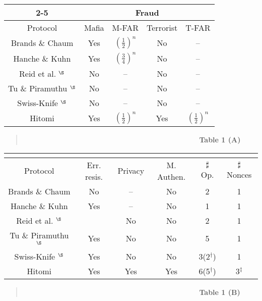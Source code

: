 \documentclass{article}
\begin{document}
\begin{table*}
  \centering
  \caption{Performance Comparison of distance bounding protocols}\label{table::pcomparison}
\begin{scriptsize}
\begin{tabular}{|c|c|c|c|c|}
  \cline{2-5}
  \multicolumn{1}{c}{} & \multicolumn{4}{|c|}{Fraud} \\ \hline
Protocol & Mafia & M-FAR & Terrorist & T-FAR  \\ \hline
  Brands \& Chaum \cite{brands94} & Yes & $(\frac{1}{2})^n$ & No & --  \\ \hline
  Hanche \& Kuhn \cite{hancke05} & Yes & $(\frac{3}{4})^n$ & No & --  \\ \hline
  Reid et al. \cite{reid2007}$^\S$ & No & -- & No & -- \\ \hline
  Tu \& Piramuthu \cite{TuP-2007-rfidtechnology}$^\S$  & No & -- & No & --  \\ \hline
  Swiss-Knife \cite{KimAKSP-2008-icisc}$^\S$ & No & -- & No & -- \\ \hline
  Hitomi  & Yes & $(\frac{1}{2})^n$ & Yes & $(\frac{1}{2})^n$ \\
  \hline
\end{tabular}
\begin{quote}
   ~~~~~~~~~~~~~~~~~~~~~~~~~~~~~~~~~~~~~~~~~~~~~~~~~ \textbf{Table 1 (A)}
\end{quote}


\begin{tabular}{|c|c|c|c|c|c|}
\multicolumn{1}{c}{}&   \multicolumn{5}{c}{} \\ \hline
Protocol & Err. resis. & Privacy & M. Authen. & $\sharp$ Op. & $\sharp$ Nonces   \\ \hline
  Brands \& Chaum \cite{brands94} &  No &  -- & No & 2 & 1 \\ \hline
  Hanche \& Kuhn \cite{hancke05} & Yes &  -- & No & 1 & 1 \\ \hline
  Reid et al. \cite{reid2007}$^\S$ & &  No & No & 2 & 1 \\ \hline
  Tu \& Piramuthu \cite{TuP-2007-rfidtechnology}$^\S$  &  Yes &  No & No & 5 & 1 \\ \hline
  Swiss-Knife \cite{KimAKSP-2008-icisc}$^\S$ & Yes &  No & No & 3(2$^\dag$) & 1\\ \hline
  Hitomi  & Yes &  Yes & Yes & 6(5$^\dag$) & 3$^\ddag$\\
  \hline
\end{tabular}
\begin{quote}
   ~~~~~~~~~~~~~~~~~~~~~~~~~~~~~~~~~~~~~~~~~~~~~~~~~ \textbf{Table 1 (B)}
\end{quote}


\end{scriptsize}
\end{table*}
\end{document}
